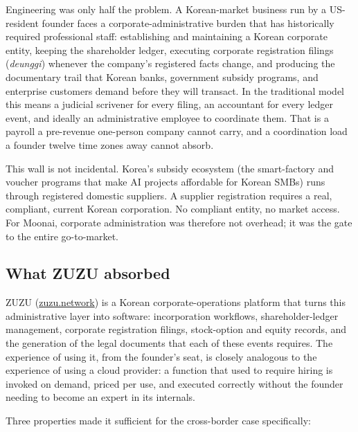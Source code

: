 \documentclass{article}
\begin{document}
Engineering was only half the problem. A Korean-market business run by a US-resident founder faces a corporate-administrative burden that has historically required professional staff: establishing and maintaining a Korean corporate entity, keeping the shareholder ledger, executing corporate registration filings (\emph{deunggi}) whenever the company's registered facts change, and producing the documentary trail that Korean banks, government subsidy programs, and enterprise customers demand before they will transact. In the traditional model this means a judicial scrivener for every filing, an accountant for every ledger event, and ideally an administrative employee to coordinate them. That is a payroll a pre-revenue one-person company cannot carry, and a coordination load a founder twelve time zones away cannot absorb.

This wall is not incidental. Korea's subsidy ecosystem (the smart-factory and voucher programs that make AI projects affordable for Korean SMBs) runs through registered domestic suppliers. A supplier registration requires a real, compliant, current Korean corporation. No compliant entity, no market access. For Moonai, corporate administration was therefore not overhead; it was the gate to the entire go-to-market.

\subsection{What ZUZU absorbed}

ZUZU (\href{https://zuzu.network}{zuzu.network}) is a Korean corporate-operations platform that turns this administrative layer into software: incorporation workflows, shareholder-ledger management, corporate registration filings, stock-option and equity records, and the generation of the legal documents that each of these events requires. The experience of using it, from the founder's seat, is closely analogous to the experience of using a cloud provider: a function that used to require hiring is invoked on demand, priced per use, and executed correctly without the founder needing to become an expert in its internals.

Three properties made it sufficient for the cross-border case specifically:
\end{document}
